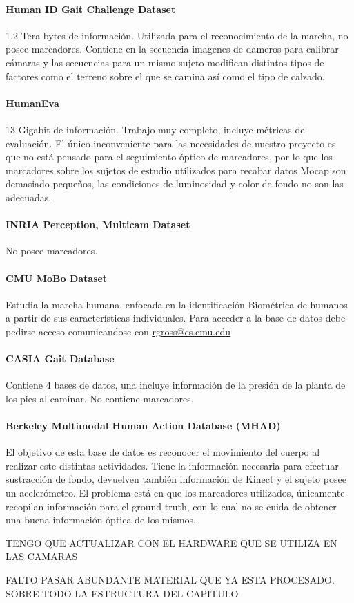 \paragraph{Human ID Gait Challenge Dataset}
1.2 Tera bytes de información. Utilizada para el reconocimiento de la marcha,  no posee marcadores. Contiene en la secuencia imagenes de dameros para calibrar cámaras y las secuencias para un mismo sujeto modifican distintos tipos de factores como el terreno sobre el que se camina así como el tipo de calzado.

\paragraph{HumanEva}
13 Gigabit de información. Trabajo muy completo, incluye métricas de evaluación. El único inconveniente para las necesidades de nuestro proyecto es que no está pensado para el seguimiento óptico de marcadores, por lo que los marcadores sobre los sujetos de estudio utilizados para recabar datos Mocap son demasiado pequeños, las condiciones de luminosidad y color de fondo no son las adecuadas.

\paragraph{INRIA Perception, Multicam Dataset}
No posee marcadores. 

\paragraph{CMU MoBo Dataset}
Estudia la marcha humana, enfocada en la identificación Biométrica de humanos a partir de sus características individuales. Para acceder a la base de datos debe pedirse acceso comunicandose con \textcolor{blue}{\underline{\url{rgross@cs.cmu.edu }}}

\paragraph{CASIA Gait Database} 
Contiene 4 bases de datos, una incluye información de la presión de la planta de los pies al caminar. No contiene marcadores.

\paragraph{Berkeley Multimodal Human Action Database (MHAD)}
El objetivo de esta base de datos es reconocer el movimiento del cuerpo al realizar este distintas actividades. Tiene la información necesaria para efectuar sustracción de fondo, devuelven también información de Kinect y el sujeto posee un acelerómetro. El problema está en que los marcadores utilizados, únicamente recopilan información para el ground truth, con lo cual no se cuida de obtener una buena información óptica de los mismos.




TENGO QUE ACTUALIZAR CON EL HARDWARE QUE SE UTILIZA EN LAS CAMARAS


FALTO PASAR ABUNDANTE MATERIAL QUE YA ESTA PROCESADO. SOBRE TODO LA ESTRUCTURA DEL CAPITULO 
